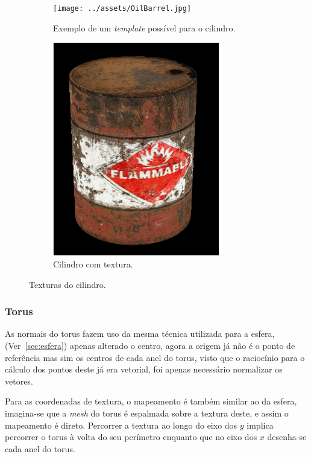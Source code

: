 \documentclass[a4paper]{article}
\begin{document}
\begin{figure}[H]
    \centering
    \begin{subfigure}{0.4\textwidth}
        \texttt{[image: ../assets/OilBarrel.jpg]}
        \caption{Exemplo de um \textit{template} possível para o
        cilindro.}
    \end{subfigure}
    \begin{subfigure}{0.4\textwidth}
        \centering
        \includegraphics[width=0.8\textwidth]{cylinder.png}
        \caption{Cilindro com textura.}
    \end{subfigure}
    \caption{Texturas do cilindro.}\label{fig:cilindro}
\end{figure}

\subsubsection{Torus}
As normais do torus fazem uso da mesma técnica utilizada para a esfera,
(Ver~\ref{sec:esfera}) apenas alterado o centro, agora a origem já não é o
ponto de referência mas sim os centros de cada anel do torus, visto que o
raciocínio para o cálculo dos pontos deste já era vetorial, foi apenas
necessário normalizar os vetores.

Para as coordenadas de textura, o mapeamento é também similar ao da esfera,
imagina-se que a \textit{mesh} do torus é espalmada sobre a textura deste, e
assim o mapeamento é direto. Percorrer a textura ao longo do eixo dos $y$
implica percorrer o torus à volta do seu perímetro enquanto que no eixo dos $x$
desenha-se cada anel do torus.
\end{document}
